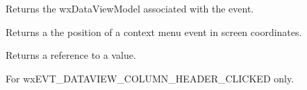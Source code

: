 Returns the wxDataViewModel associated with the event.


\label{wxdatavieweventgetposition}


Returns a the position of a context menu event in screen coordinates.


\label{wxdatavieweventgetvalue}


Returns a reference to a value.


\label{wxdatavieweventsetcolumn}



\label{wxdatavieweventsetdataviewcolumn}


For wxEVT\_DATAVIEW\_COLUMN\_HEADER\_CLICKED only.


\label{wxdatavieweventsetmodel}




\label{wxdatavieweventsetvalue}


